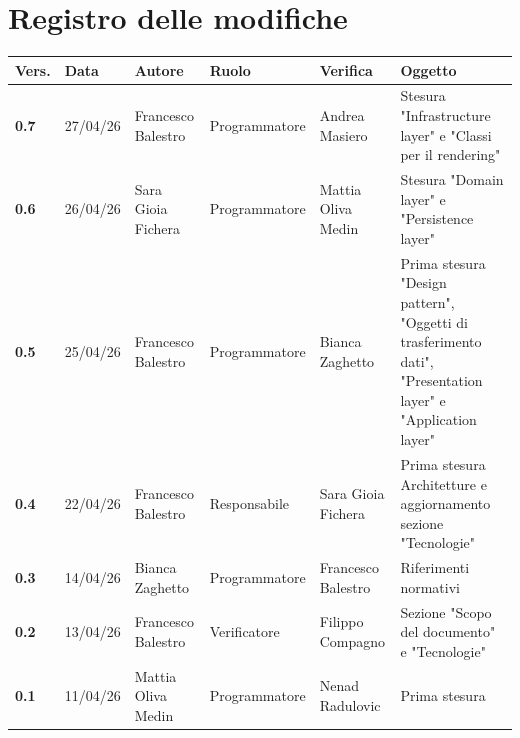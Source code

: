 \documentclass[a4paper,12pt]{article}
\begin{document}
    

    \section*{Registro delle modifiche} {
        \begin{table}[h!]
                \begin{tabularx}{\textwidth}{|l|l|l|l|L|L|}
                \hline
                \textbf{Vers.} & \textbf{Data} & \textbf{Autore} & \textbf{Ruolo} & \textbf{Verifica} & \textbf{Oggetto} \\
                \hline
                \textbf{0.7} & 27/04/26 & Francesco Balestro & Programmatore & Andrea Masiero & Stesura "Infrastructure layer" e "Classi per il rendering" \\
                \hline
                \textbf{0.6} & 26/04/26 & Sara Gioia Fichera & Programmatore & Mattia Oliva Medin & Stesura "Domain layer" e "Persistence layer" \\
                \hline
                \textbf{0.5} & 25/04/26 & Francesco Balestro & Programmatore & Bianca Zaghetto & Prima stesura "Design pattern", "Oggetti di trasferimento dati", "Presentation layer" e "Application layer" \\
                \hline
                \textbf{0.4} & 22/04/26 & Francesco Balestro & Responsabile & Sara Gioia Fichera & Prima stesura Architetture e aggiornamento sezione "Tecnologie" \\
                \hline
                \textbf{0.3} & 14/04/26 & Bianca Zaghetto & Programmatore & Francesco Balestro & Riferimenti normativi \\
                \hline
                \textbf{0.2} & 13/04/26 & Francesco Balestro & Verificatore & Filippo Compagno & Sezione "Scopo del documento" e "Tecnologie" \\
                \hline
                \textbf{0.1} & 11/04/26 & Mattia Oliva Medin & Programmatore & Nenad Radulovic & Prima stesura \\
                \hline
            \end{tabularx}
        \end{table}
    }
    \newpage
    
    \tableofcontents
    \newpage

    \listoffigures
    \newpage
    
    \listoftables
    \newpage
\end{document}
